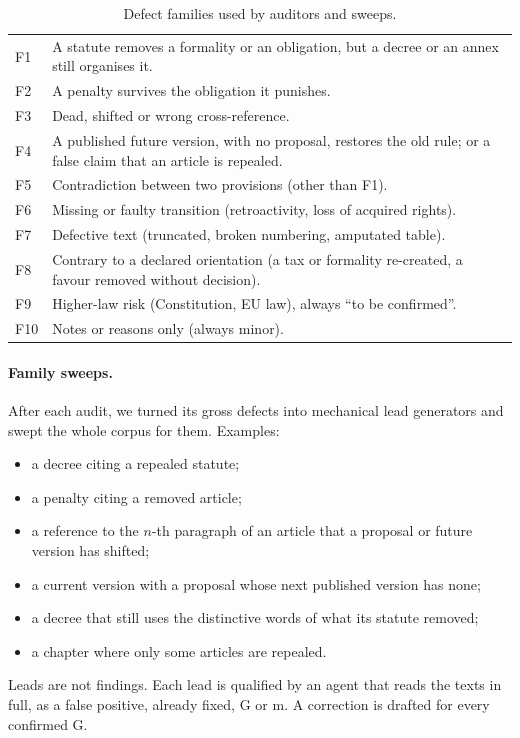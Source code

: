 \documentclass[11pt,a4paper]{article}
\begin{document}
\begin{table}[ht]
\centering
\small
\begin{tabularx}{\linewidth}{lX}
\toprule
F1 & A statute removes a formality or an obligation, but a decree or an annex still organises it.\\
F2 & A penalty survives the obligation it punishes.\\
F3 & Dead, shifted or wrong cross-reference.\\
F4 & A published future version, with no proposal, restores the old rule; or a false claim that an article is repealed.\\
F5 & Contradiction between two provisions (other than F1).\\
F6 & Missing or faulty transition (retroactivity, loss of acquired rights).\\
F7 & Defective text (truncated, broken numbering, amputated table).\\
F8 & Contrary to a declared orientation (a tax or formality re-created, a favour removed without decision).\\
F9 & Higher-law risk (Constitution, EU law), always ``to be confirmed''.\\
F10 & Notes or reasons only (always minor).\\
\bottomrule
\end{tabularx}
\caption{Defect families used by auditors and sweeps.}
\label{tab:families}
\end{table}

\paragraph{Family sweeps.}
After each audit, we turned its gross defects into mechanical lead generators and swept the whole corpus for them. Examples:
\begin{itemize}
  \item a decree citing a repealed statute;
  \item a penalty citing a removed article;
  \item a reference to the $n$-th paragraph of an article that a proposal or future version has shifted;
  \item a current version with a proposal whose next published version has none;
  \item a decree that still uses the distinctive words of what its statute removed;
  \item a chapter where only some articles are repealed.
\end{itemize}
Leads are not findings. Each lead is qualified by an agent that reads the texts in full, as a false positive, already fixed, G or m. A correction is drafted for every confirmed G.
\end{document}
